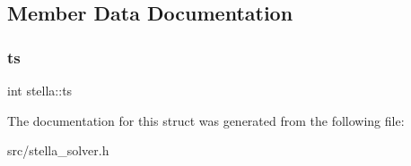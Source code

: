 \subsection{Member Data Documentation}
\mbox{\label{structstella_acc8da3f8945e90877d65acb6d89e3e09}} 
\subsubsection{\texorpdfstring{ts}{ts}}
{\footnotesize\ttfamily int stella\+::ts}



The documentation for this struct was generated from the following file\+:\begin{DoxyCompactItemize}
\item 
src/stella\+\_\+solver.\+h\end{DoxyCompactItemize}
